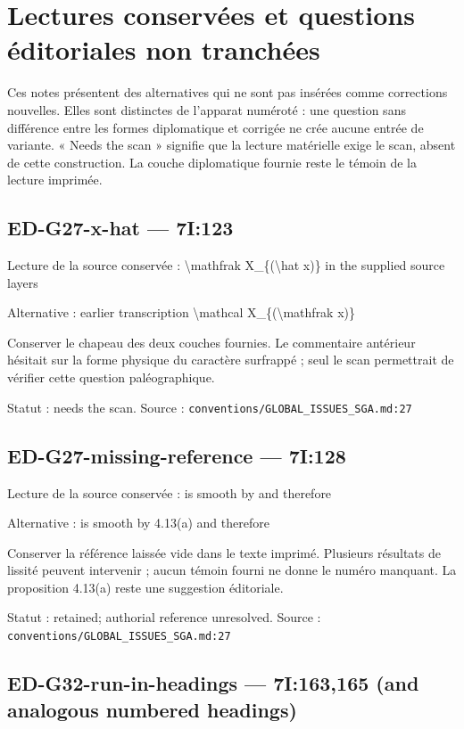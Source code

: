 \clearpage

\section*{Lectures conservées et questions éditoriales non tranchées}

Ces notes présentent des alternatives qui ne sont pas insérées comme corrections nouvelles. Elles sont distinctes de l’apparat numéroté : une question sans différence entre les formes diplomatique et corrigée ne crée aucune entrée de variante. « Needs the scan » signifie que la lecture matérielle exige le scan, absent de cette construction. La couche diplomatique fournie reste le témoin de la lecture imprimée.

\subsection*{ED-G27-x-hat — 7I:123}

Lecture de la source conservée : \textbackslash{}mathfrak X\_\{(\textbackslash{}hat x)\} in the supplied source layers

Alternative : earlier transcription \textbackslash{}mathcal X\_\{(\textbackslash{}mathfrak x)\}

Conserver le chapeau des deux couches fournies. Le commentaire antérieur hésitait sur la forme physique du caractère surfrappé ; seul le scan permettrait de vérifier cette question paléographique.

Statut : needs the scan. Source : \nolinkurl{conventions/GLOBAL_ISSUES_SGA.md:27}

\subsection*{ED-G27-missing-reference — 7I:128}

Lecture de la source conservée : is smooth by and therefore

Alternative : is smooth by 4.13(a) and therefore

Conserver la référence laissée vide dans le texte imprimé. Plusieurs résultats de lissité peuvent intervenir ; aucun témoin fourni ne donne le numéro manquant. La proposition 4.13(a) reste une suggestion éditoriale.

Statut : retained; authorial reference unresolved. Source : \nolinkurl{conventions/GLOBAL_ISSUES_SGA.md:27}

\subsection*{ED-G32-run-in-headings — 7I:163,165 (and analogous numbered headings)}

